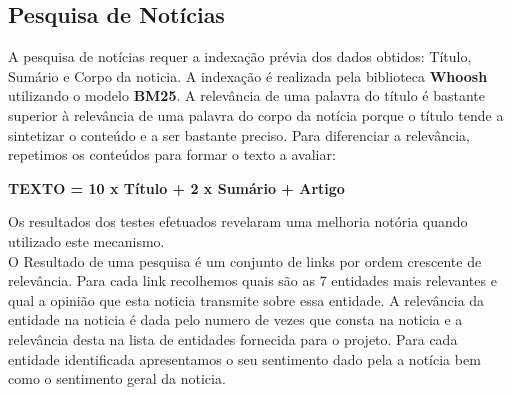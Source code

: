 \subsection{Pesquisa de Notícias}
\label{sec:news_search}
\hspace{15pt}A pesquisa de notícias requer a indexação prévia dos dados obtidos: Título, Sumário e Corpo da noticia.  A indexação é realizada pela biblioteca \textbf{Whoosh} utilizando o modelo \textbf{BM25}. A relevância de uma palavra do título é bastante superior à relevância de uma palavra do corpo da notícia porque o título tende a sintetizar o conteúdo e a ser bastante preciso. 
Para diferenciar a relevância, repetimos os conteúdos para formar o texto a 
avaliar:\\
\centerline{\textbf{TEXTO = 10 x Título + 2 x Sumário + Artigo}}
\newline
Os resultados dos testes efetuados revelaram uma melhoria notória quando 
utilizado este mecanismo. \\
\hspace{15pt}O Resultado de uma pesquisa é um conjunto de links por ordem crescente de relevância. Para cada link recolhemos quais são as 7 entidades mais relevantes  e qual a opinião que esta noticia transmite sobre essa entidade. A relevância da entidade na noticia é dada pelo numero de vezes que consta na noticia e a relevância desta na lista de entidades fornecida para o projeto. Para cada  entidade identificada apresentamos o seu sentimento dado pela a notícia bem como o sentimento geral da noticia.